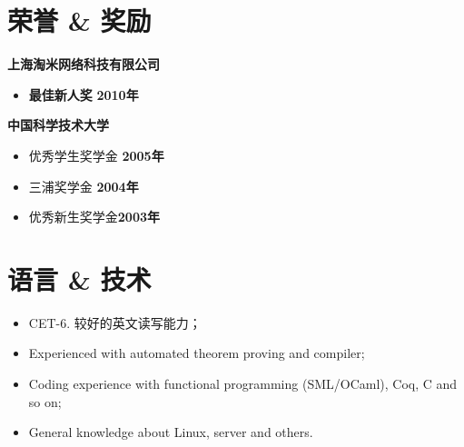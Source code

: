 \documentclass[margin]{res}
\newcommand{\ustc}{中国科学技术大学}
\newcommand{\taomee}{上海淘米网络科技有限公司}
\begin{document}

\section{荣誉 \& 奖励} 
{\bf \taomee}\\
\begin{itemize}
    \item {\bf 最佳新人奖} \hfill {\bf 2010年}
\end{itemize}
{\bf \ustc}\\
\begin{itemize}
    \item 优秀学生奖学金 \hfill {\bf 2005年}
    \item 三浦奖学金 \hfill {\bf 2004年}
    \item 优秀新生奖学金\hfill {\bf 2003年}
\end{itemize}

\section{语言 \& 技术}
\begin{itemize}
    \item CET-6. 较好的英文读写能力；
    \item Experienced with automated theorem proving and compiler;
    \item Coding experience with functional programming (SML/OCaml), Coq, C and so on;
    \item General knowledge about Linux, server and others.
\end{itemize}



\end{document}

